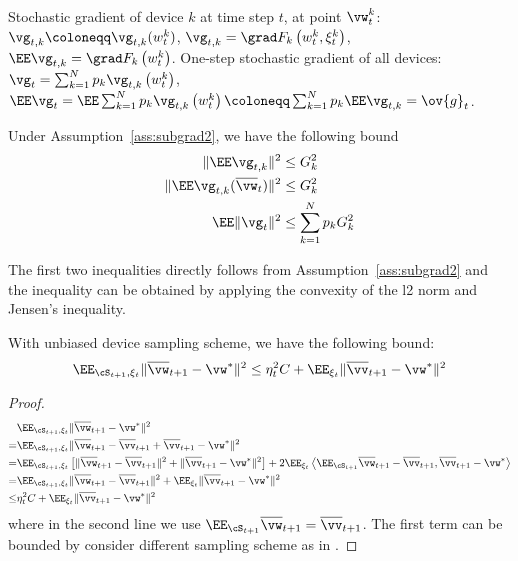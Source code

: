 
Stochastic gradient of device $k$ at time step $t$, at point $\vw_t^k$: 
	$\vg_{t,k} \coloneqq \vg_{t,k}(w_t^k)$,
	$ \vg_{t, k} = \grad F_{k}\left(w_{t}^{k}, \xi_{t}^{k}\right) $,
	$\EE \vg_{t, k} = \grad F_{k}\left(w_{t}^{k}\right)$.
One-step stochastic gradient of all devices:
$\vg_{t}=\sum_{k=1}^{N} p_{k} \vg_{t, k}\left(w_{t}^{k}\right) $, $\EE \vg_{t}= \EE \sum_{k=1}^{N} p_{k} \vg_{t, k}\left(w_{t}^{k}\right) \coloneqq \sum_{k=1}^{N} p_{k} \EE \vg_{t, k} = \ov{g}_t$.

\begin{lemma}
Under Assumption~\ref{ass:subgrad2}, we have the following bound
\begin{align}
	 \|\EE \vg_{t,k}\|^2 & \leq G_k^2	\label{eq:g3} \\
	\|\EE \vg_{t,k}(\overline{\vw}_t)\|^2 & \leq  G_k^2 \label{eq:g2} \\
   \EE\| \vg_{t} \|^{2} &  \leq  \sum_{k=1}^N p_k G_k^2  \label{eq:g1}
\end{align}
\label{lma:gradient}
\end{lemma}
The first two inequalities directly follows from Assumption~\ref{ass:subgrad2} and the inequality
can be obtained by applying the convexity of the l2 norm and Jensen's inequality. 

\begin{lemma}
	With unbiased device sampling scheme, we have the following bound: 
	$$ \EE_{\cS_{t+1}, \xi_{t}} \|\overline{\vw}_{t+1} - \vw^*\|^2 \leq \eta_t^2 C + \EE_{\xi_t} \|\overline{\vv}_{t+1} - \vw^*\|^2 $$
\label{lma:wdistance}
\end{lemma}
\begin{proof}
\begin{align*}
& \EE_{\cS_{t+1}, \xi_{t}} \|\overline{\vw}_{t+1} - \vw^*\|^2 \\
=& \EE_{\cS_{t+1}, \xi_{t}} \|\overline{\vw}_{t+1} - \overline{\vv}_{t+1} + \overline{\vv}_{t+1} - \vw^*\|^2\\
=& \EE_{\cS_{t+1}, \xi_{t}} \left[\|\overline{\vw}_{t+1} - \overline{\vv}_{t+1}\|^2 + \|\overline{\vv}_{t+1} - \vw^*\|^2\right] + 2\EE_{\xi_{t}} \left<\EE_{\cS_{t+1}} \overline{\vw}_{t+1} - \overline{\vv}_{t+1},   \overline{\vv}_{t+1} - \vw^*\right> \\
=& \EE_{\cS_{t+1}, \xi_{t}} \|\overline{\vw}_{t+1} - \overline{\vv}_{t+1}\|^2 + \EE_{\xi_t} \|\overline{\vv}_{t+1} - \vw^*\|^2 \\
\leq&  \eta_t^2 C + \EE_{\xi_t} \|\overline{\vv}_{t+1} - \vw^*\|^2 %
\end{align*}
where in the second line we use $\EE_{\cS_{t+1}} \overline{\vw}_{t+1}  = \overline{\vv}_{t+1}$. 
The first term can be bounded by consider different sampling scheme as in \eq{\ref{eq:partialsample}}.
\end{proof}

